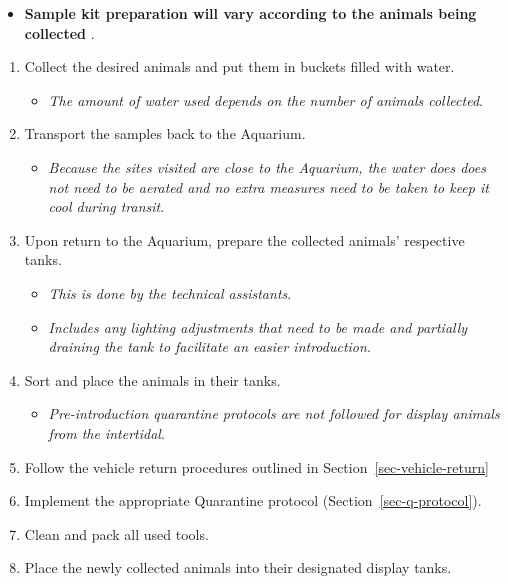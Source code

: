 \documentclass[
  letterpaper,
  DIV=11,
  numbers=noendperiod]{scrreprt}
\providecommand{\tightlist}{%
  \setlength{\itemsep}{0pt}\setlength{\parskip}{0pt}}\usepackage{longtable,booktabs,array}
\begin{document}
\begin{itemize}
\tightlist
\item
  \textbf{Sample kit preparation will vary according to the animals
  being collected} .
\end{itemize}

\begin{enumerate}
\def\labelenumi{\arabic{enumi}.}
\setcounter{enumi}{5}
\tightlist
\item
  Collect the desired animals and put them in buckets filled with water.

  \begin{itemize}
  \tightlist
  \item
    \emph{The amount of water used depends on the number of animals
    collected}.
  \end{itemize}
\item
  Transport the samples back to the Aquarium.

  \begin{itemize}
  \tightlist
  \item
    \emph{Because the sites visited are close to the Aquarium, the water
    does does not need to be aerated and no extra measures need to be
    taken to keep it cool during transit}.
  \end{itemize}
\item
  Upon return to the Aquarium, prepare the collected animals' respective
  tanks.

  \begin{itemize}
  \tightlist
  \item
    \emph{This is done by the technical assistants}.
  \item
    \emph{Includes any lighting adjustments that need to be made and
    partially draining the tank to facilitate an easier introduction}.
  \end{itemize}
\item
  Sort and place the animals in their tanks.

  \begin{itemize}
  \tightlist
  \item
    \emph{Pre-introduction quarantine protocols are not followed for
    display animals from the intertidal}.
  \end{itemize}
\item
  Follow the vehicle return procedures outlined in
  Section~\ref{sec-vehicle-return}
\item
  Implement the appropriate Quarantine protocol
  (Section~\ref{sec-q-protocol}).
\item
  Clean and pack all used tools.
\item
  Place the newly collected animals into their designated display tanks.
\end{enumerate}
\end{document}
